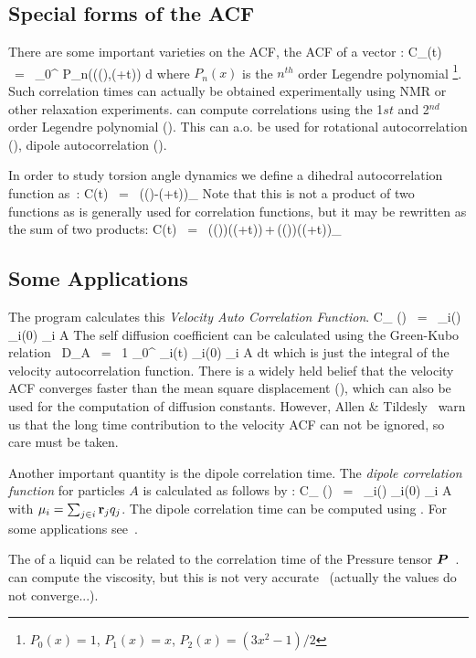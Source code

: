 {\subsection{Special forms of the ACF}
There are some important varieties on the ACF, {\eg} the ACF of a vector :
\beq
C_{}(t) ~=~       \int_0^{\infty} P_n(\cos\angle\left((\xi),(\xi+t)\right) {\rm d} \xi
\label{eqn:corrleg}
\eeq
where $P_n(x)$ is the $n^{th}$ order Legendre polynomial
\footnote{$P_0(x) = 1$, $P_1(x) = x$, $P_2(x) = (3x^2-1)/2$}.
Such correlation times 
can actually be obtained experimentally using {\eg} NMR or other relaxation 
experiments. {\gromacs} can compute correlations using 
the 1${st}$ and 2$^{nd}$ order Legendre polynomial ().
This can a.o. be used for rotational autocorrelation ({\tt {}}), 
dipole autocorrelation ({\tt {}}).

In order to study torsion angle dynamics we define a dihedral 
autocorrelation function as~\cite{Spoel97a}:
\beq
C(t)    ~=~     \left\langle \cos(\theta(\tau)-\theta(\tau+t))\right\rangle_{\tau}
\label{eqn:coenk}
\eeq
Note that this is not a  product of two functions 
as is generally used for correlation
functions, but it may be rewritten as the sum of two products:
\beq
C(t)    ~=~     \left\langle\cos(\theta(\tau))\cos(\theta(\tau+t))\,+\,\sin(\theta(\tau))\sin(\theta(\tau+t))\right\rangle_{\tau}
\label{eqn:cot}
\eeq

\subsection{Some Applications}
The program {\tt {}} calculates this {\em Velocity Auto Correlation 
Function}.
\beq
C_{} (\tau) ~=~ _i(\tau) _i(0) \rangle_{i \in A}
\eeq
The self diffusion coefficient can be calculated using the Green-Kubo 
relation~\cite{Allen87}
\beq
D_A ~=~ {1} \int_0^{\infty} _i(t) _i(0) \rangle_{i \in A} \; dt
\eeq
which is just the integral of the velocity autocorrelation function.
There is a widely held belief that the velocity ACF converges faster than the mean
square displacement (), which can also be used for the computation of 
diffusion constants. However, Allen \& Tildesly~\cite{Allen87} 
warn us that the long time 
contribution to the velocity ACF can not be ignored, so care must be taken.

Another important quantity is the dipole correlation time. The {\em dipole 
correlation function} for particles $A$ is calculated as follows by 
{\tt {}}:
\beq
C_{\mu} (\tau) ~=~
\langle {\bf \mu}_i(\tau) \cdot {\bf \mu}_i(0) \rangle_{i \in A}
\eeq
with ${\bf \mu}_i = \sum_{j \in i} {\bf r}_j q_j$. The dipole correlation time 
can be computed using .
For some applications see~\cite{Spoel98a}.

The  of a liquid can be related to the correlation 
time of the Pressure tensor $\mbox{\boldmath ${P}$}$~\cite{PSmith93c,Balasubramanian96}.
{\tt {}} can compute the viscosity,
but this is not very accurate~\cite{Hess2002a}
(actually the values do not converge...).
} %

